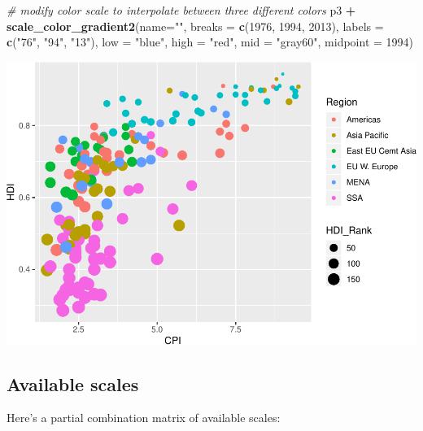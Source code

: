 \documentclass[
]{book}
\newenvironment{Shaded}{\begin{snugshade}}{\end{snugshade}}
\newcommand{\CommentTok}[1]{\textcolor[rgb]{0.56,0.35,0.01}{\textit{#1}}}
\newcommand{\DataTypeTok}[1]{\textcolor[rgb]{0.13,0.29,0.53}{#1}}
\newcommand{\DecValTok}[1]{\textcolor[rgb]{0.00,0.00,0.81}{#1}}
\newcommand{\KeywordTok}[1]{\textcolor[rgb]{0.13,0.29,0.53}{\textbf{#1}}}
\newcommand{\NormalTok}[1]{#1}
\newcommand{\OperatorTok}[1]{\textcolor[rgb]{0.81,0.36,0.00}{\textbf{#1}}}
\newcommand{\StringTok}[1]{\textcolor[rgb]{0.31,0.60,0.02}{#1}}
\begin{document}
\begin{Shaded}
\begin{Highlighting}[]
\CommentTok{\# modify color scale to interpolate between three different colors}
\NormalTok{p3 }\OperatorTok{+}
\StringTok{  }\KeywordTok{scale\_color\_gradient2}\NormalTok{(}\DataTypeTok{name=}\StringTok{""}\NormalTok{,}
                        \DataTypeTok{breaks =} \KeywordTok{c}\NormalTok{(}\DecValTok{1976}\NormalTok{, }\DecValTok{1994}\NormalTok{, }\DecValTok{2013}\NormalTok{),}
                        \DataTypeTok{labels =} \KeywordTok{c}\NormalTok{(}\StringTok{"\textquotesingle{}76"}\NormalTok{, }\StringTok{"\textquotesingle{}94"}\NormalTok{, }\StringTok{"\textquotesingle{}13"}\NormalTok{),}
                        \DataTypeTok{low =} \StringTok{"blue"}\NormalTok{,}
                        \DataTypeTok{high =} \StringTok{"red"}\NormalTok{,}
                        \DataTypeTok{mid =} \StringTok{"gray60"}\NormalTok{,}
                        \DataTypeTok{midpoint =} \DecValTok{1994}\NormalTok{)}
\end{Highlighting}
\end{Shaded}

\includegraphics{R/Rgraphics/figures/unnamed-chunk-201-1.pdf}

\hypertarget{available-scales}{%
\subsection{Available scales}\label{available-scales}}

Here's a partial combination matrix of available scales:
\end{document}
